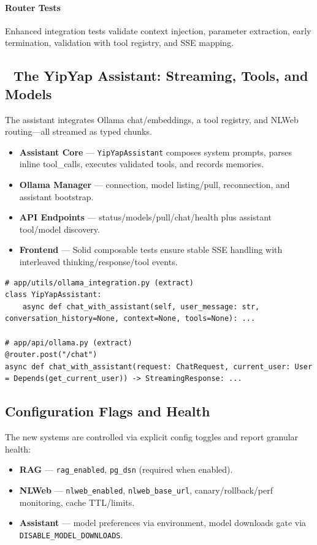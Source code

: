 \documentclass[11pt]{article}
\begin{document}
\paragraph{Router Tests}
Enhanced integration tests validate context injection, parameter extraction, early termination, validation with tool registry, and SSE mapping.

\subsection{🦊 The YipYap Assistant: Streaming, Tools, and Models}

The assistant integrates Ollama chat/embeddings, a tool registry, and NLWeb routing—all streamed as typed chunks.

\begin{itemize}
  \item \textbf{Assistant Core} — \texttt{YipYapAssistant} composes system prompts, parses inline tool\_calls, executes validated tools, and records memories.
  \item \textbf{Ollama Manager} — connection, model listing/pull, reconnection, and assistant bootstrap.
  \item \textbf{API Endpoints} — status/models/pull/chat/health plus assistant tool/model discovery.
  \item \textbf{Frontend} — Solid composable tests ensure stable SSE handling with interleaved thinking/response/tool events.
\end{itemize}

\begin{lstlisting}[style=python]
# app/utils/ollama_integration.py (extract)
class YipYapAssistant:
    async def chat_with_assistant(self, user_message: str, conversation_history=None, context=None, tools=None): ...

# app/api/ollama.py (extract)
@router.post("/chat")
async def chat_with_assistant(request: ChatRequest, current_user: User = Depends(get_current_user)) -> StreamingResponse: ...
\end{lstlisting}

\subsection{Configuration Flags and Health}

The new systems are controlled via explicit config toggles and report granular health:

\begin{itemize}
  \item \textbf{RAG} — \texttt{rag\_enabled}, \texttt{pg\_dsn} (required when enabled).
  \item \textbf{NLWeb} — \texttt{nlweb\_enabled}, \texttt{nlweb\_base\_url}, canary/rollback/perf monitoring, cache TTL/limits.
  \item \textbf{Assistant} — model preferences via environment, model downloads gate via \texttt{DISABLE\_MODEL\_DOWNLOADS}.
\end{itemize}
\end{document}
